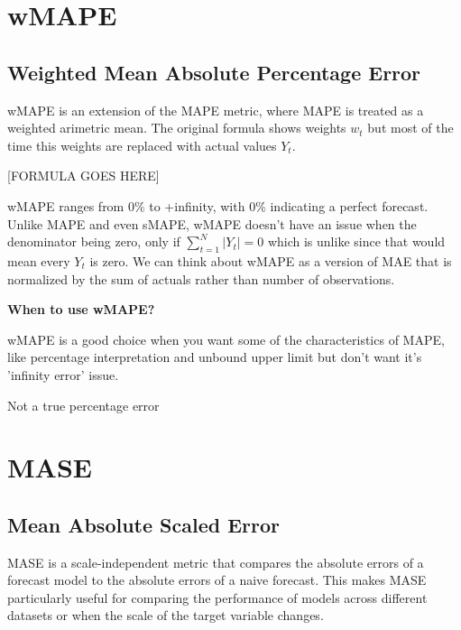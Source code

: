 \section{wMAPE}
\subsection{Weighted Mean Absolute Percentage Error}

wMAPE is an extension of the MAPE metric, where MAPE is treated as a weighted arimetric mean. The original formula shows weights $w_{t}$ but most of the time this weights are replaced
with actual values $Y_{t}$.

\begin{center}
    [FORMULA GOES HERE]
\end{center}

wMAPE ranges from 0\% to +infinity, with 0\% indicating a perfect forecast. Unlike MAPE and even sMAPE, wMAPE doesn't have an issue when the denominator being zero,
only if $\sum_{t=1}^{N}|Y_{t}| = 0$ which is unlike since that would mean every $Y_{t}$ is zero. We can think about wMAPE as a version of MAE that is normalized by the sum of
actuals rather than number of observations.

\textbf{When to use wMAPE?}

wMAPE is a good choice when you want some of the characteristics of MAPE, like percentage interpretation and unbound upper limit but don't want it's 'infinity error' issue.

{
    \item Not a true percentage error
}

\clearpage
\thispagestyle{regressionstyle}
\section{MASE}
\subsection{Mean Absolute Scaled Error}

MASE is a scale-independent metric that compares the absolute errors of a forecast model to the absolute errors of a naive forecast.
This makes MASE particularly useful for comparing the performance of models across different datasets or when the scale of the target variable changes.

